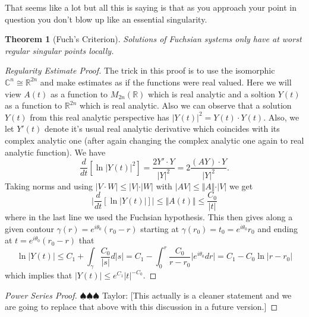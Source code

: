 \documentclass[12pt]{book}
\newcommand{\taylor}[1]{{\color{blue} \sf $\spadesuit\spadesuit\spadesuit$ Taylor: [#1]}}
\numberwithin{equation}{section}
\newtheorem{theorem}{Theorem}[subsection]
\theoremstyle{definition}
\theoremstyle{remark}
\newcommand{\RR}{\mathbb{R}}
\newcommand{\CC}{\mathbb{C}}
\begin{document}
That seems like a lot but all this is saying is that as you approach your point in question you don't blow up like an essential singularity.
\begin{theorem}[Fuch's Criterion]
	Solutions of Fuchsian systems only have at worst regular singular points locally. 
\end{theorem}
\begin{proof}[Regularity Estimate Proof]
	The trick in this proof is to use the isomorphic $\CC^n \cong \RR^{2n}$ and make estimates as if the functions were real valued. 
	Here we will view $A(t)$ as a function to $M_{2n}(\RR)$ which is real analytic and a soltion $Y(t)$ as a function to $\RR^{2n}$ which is real analytic. 
	Also we can observe that a solution $Y(t)$ from this real analytic perspective has $\vert Y(t) \vert^2 = Y(t) \cdot Y(t)$. 
	Also, we let $Y'(t)$ denote it's usual real analytic derivative which coincides with its complex analytic one (after again changing the complex analytic one again to real analytic function). 
	We have 
	$$\dfrac{d}{dt}\left[ \ln \vert Y(t) \vert^2 \right] = \dfrac{2 Y'\cdot Y}{\vert Y\vert^2} = 2\frac{ (A Y)\cdot Y}{\vert Y \vert^2}.$$
	 Taking norms and using $\vert V \cdot W \vert \leq \vert V \vert \cdot \vert W \vert$ with $\vert A V \vert \leq \Vert A \Vert \cdot \vert V \vert $ we get  
	  $$ \vert \dfrac{d}{dt}\left[ \ln \vert Y(t) \vert \right] \vert  \leq \Vert A(t) \Vert \leq \frac{C_0}{\vert t \vert}$$ 
	 where in the last line we used the Fuchsian hypothesis.
	 This then gives along a given contour $\gamma(r) = e^{i\theta_0}(r_0-r)$ starting at $\gamma(r_0) = t_0 = e^{i\theta_0}r_0$ and ending at $t=e^{i\theta_0}(r_0-r)$ that $$ \ln\vert Y(t) \vert \leq C_1 + \int_{\gamma}\frac{C_0}{\vert s \vert } d\vert s\vert =  C_1 - \int_{0}^r \frac{C_0}{r-r_0} \vert e^{i\theta_0}dr\vert = C_1 - C_0 \ln \vert r-r_0 \vert $$ 
	 which implies that $\vert Y(t) \vert \leq e^{C_1} \vert t \vert^{-C_0}$.	
\end{proof}

\begin{proof}[Power Series Proof]
	\cite[Chapters III 1.3.1]{Borel1987} \taylor{This actually is a cleaner statement and we are going to replace that above with this discussion in a future version.}
\end{proof}




\end{document}
